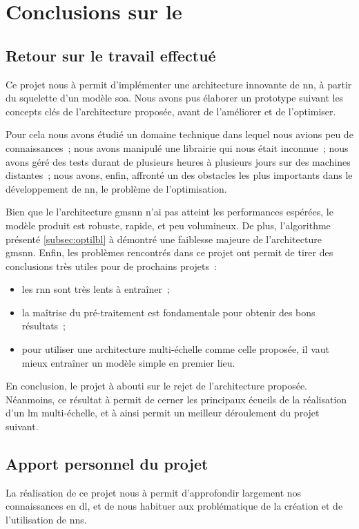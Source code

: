 \chapter{Conclusions sur le }
\section{Retour sur le travail effectué}
Ce projet nous à permit d'implémenter une architecture innovante de \gls{nn}, à partir du squelette d'un modèle \gls{soa}.
Nous avons pus élaborer un prototype suivant les concepts clés de l'architecture proposée, avant de l'améliorer et de l'optimiser.

Pour cela nous avons étudié un domaine technique dans lequel nous avions peu de connaissances~; nous avons manipulé une librairie qui nous était inconnue~;
nous avons géré des tests durant de plusieurs heures à plusieurs jours sur des machines distantes~; nous avons, enfin, affronté un des obstacles les plus importants dans le développement de \gls{nn}, le problème de l'optimisation.

Bien que le l'architecture \gls{gmsnn} n'ai pas atteint les performances espérées, le modèle produit est robuste, rapide, et peu volumineux.
De plus, l'algorithme présenté \autoref{subsec:optilbl} à démontré une faiblesse majeure de l'architecture \gls{gmsnn}.
Enfin, les problèmes rencontrés dans ce projet ont permit de tirer des conclusions très utiles pour de prochains projets~:
\begin{itemize}
	\item les \gls{rnn} sont très lents à entraîner~;
	\item la maîtrise du pré-traitement est fondamentale pour obtenir des bons résultats~;
	\item pour utiliser une architecture multi-échelle comme celle proposée, il vaut mieux entraîner un modèle simple en premier lieu.
\end{itemize}\hspace{1em}

En conclusion, le projet à abouti sur le rejet de l'architecture proposée.
Néanmoins, ce résultat à permit de cerner les principaux écueils de la réalisation d'un \gls{lm} multi-échelle, et à ainsi permit un meilleur déroulement du projet suivant.


\section{Apport personnel du projet}
La réalisation de ce projet nous à permit d'approfondir largement nos connaissances en \gls{dl}, et de nous habituer aux problématique de la création et de l'utilisation de \glspl{nn}.

